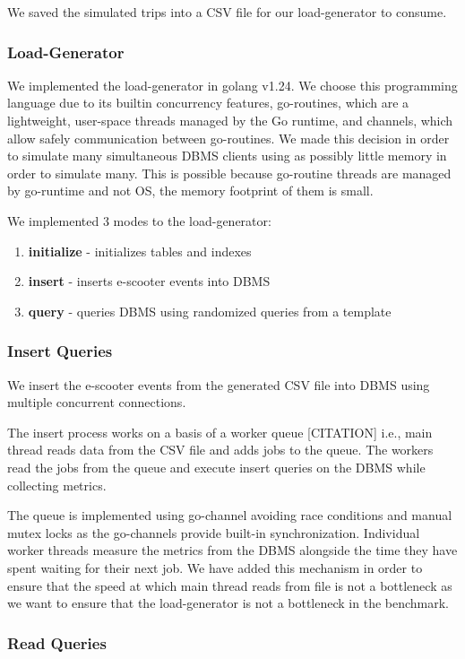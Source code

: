 We saved the simulated trips into a CSV file for our load-generator to consume.

\subsubsection{Load-Generator}
We implemented the load-generator in golang v1.24.
We choose this programming language due to its builtin concurrency features, go-routines, which are a lightweight, user-space threads managed by the Go runtime, and channels, which allow safely communication between go-routines.
We made this decision in order to simulate many simultaneous DBMS clients using as possibly little memory in order to simulate many.
This is possible because go-routine threads are managed by go-runtime and not OS, the memory footprint of them is small.

We implemented 3 modes to the load-generator:
\begin{enumerate}
	\item \textbf{initialize} - initializes tables and indexes
	\item \textbf{insert} - inserts e-scooter events into DBMS
	\item \textbf{query} - queries DBMS using randomized queries from a template
\end{enumerate}


\subsubsection{Insert Queries}
We insert the e-scooter events from the generated CSV file into DBMS using multiple concurrent connections.

The insert process works on a basis of a worker queue [CITATION] i.e., main thread reads data from the CSV file and adds jobs to the queue.
The workers read the jobs from the queue and execute insert queries on the DBMS while collecting metrics.

The queue is implemented using go-channel avoiding race conditions and manual mutex locks as the go-channels provide built-in synchronization.
Individual worker threads measure the metrics from the DBMS alongside the time they have spent waiting for their next job.
We have added this mechanism in order to ensure that the speed at which main thread reads from file is not a bottleneck as we want to ensure that the load-generator is not a bottleneck in the benchmark.

\subsubsection{Read Queries}

